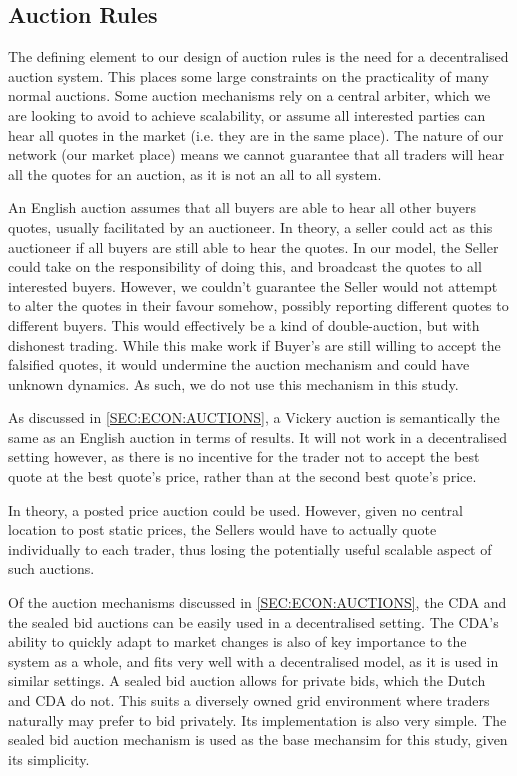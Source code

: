 \subsection{Auction Rules}
\label{SEC:METHOD:RULES}

The defining element to our design of auction rules is the need for a
decentralised auction system. This places some large constraints on the
practicality of many normal auctions. Some auction mechanisms rely on a central
arbiter, which we are looking to avoid to achieve scalability, or assume all
interested parties can hear all quotes in the market (i.e. they are in the same
place). The nature of our network (our market place) means we cannot guarantee
that all traders will hear all the quotes for an auction, as it is not an all
to all system.

An English auction assumes that all buyers are able to hear all other buyers
quotes, usually facilitated by an auctioneer. In theory, a seller could act as
this auctioneer if all buyers are still able to hear the quotes.  In our model,
the Seller could take on the responsibility of doing this, and broadcast the
quotes to all interested buyers. However, we couldn't guarantee the Seller
would not attempt to alter the quotes in their favour somehow, possibly
reporting different quotes to different buyers. This would effectively be a
kind of double-auction, but with dishonest trading. While this make work if
Buyer's are still willing to accept the falsified quotes, it would undermine
the auction mechanism and could have unknown dynamics. As such, we do not use
this mechanism in this study.

As discussed in \ref{SEC:ECON:AUCTIONS}, a Vickery auction is semantically the
same as an English auction in terms of results. It will not work in a
decentralised setting however, as there is no incentive for the trader not to
accept the best quote at the best quote's price, rather than at the second best
quote's price. 

In theory, a posted price auction could be used. However, given no central
location to post static prices, the Sellers would have to actually quote
individually to each trader, thus losing the potentially useful scalable aspect
of such auctions.

Of the auction mechanisms discussed in \ref{SEC:ECON:AUCTIONS}, the CDA and the
sealed bid auctions can be easily used in a decentralised setting.  The CDA's
ability to quickly adapt to market changes is also of key importance to the
system as a whole, and fits very well with a decentralised model, as it is used
in similar settings. A sealed bid auction allows for private bids, which the
Dutch and CDA do not.  This suits a diversely owned grid environment where
traders naturally may prefer to bid privately. Its implementation is also very
simple. The sealed bid auction mechanism is used as the base mechansim for this
study, given its simplicity.


